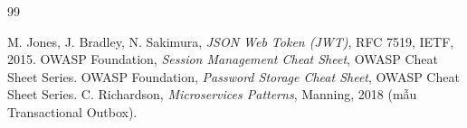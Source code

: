 \begin{thebibliography}{99}
 M. Jones, J. Bradley, N. Sakimura, \emph{JSON Web Token (JWT)}, RFC 7519, IETF, 2015.
 OWASP Foundation, \emph{Session Management Cheat Sheet}, OWASP Cheat Sheet Series.
 OWASP Foundation, \emph{Password Storage Cheat Sheet}, OWASP Cheat Sheet Series.
 C. Richardson, \emph{Microservices Patterns}, Manning, 2018 (mẫu Transactional Outbox).
\end{thebibliography}
